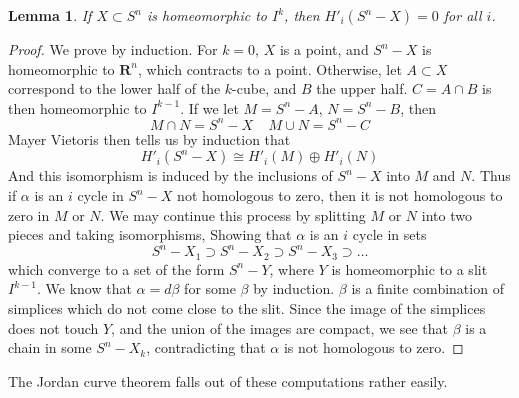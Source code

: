 \documentclass{article}
\theoremstyle{plain}
\newtheorem{lemma}[theorem]{Lemma}
\begin{document}
\begin{lemma}
    If $X \subset S^n$ is homeomorphic to $I^k$, then $H'_i(S^n - X) = 0$ for all $i$.
\end{lemma}
\begin{proof}
    We prove by induction. For $k = 0$, $X$ is a point, and $S^n - X$ is homeomorphic to $\mathbf{R}^n$, which contracts to a point. Otherwise, let $A \subset X$ correspond to the lower half of the $k$-cube, and $B$ the upper half. $C = A \cap B$ is then homeomorphic to $I^{k-1}$. If we let $M = S^n - A$, $N = S^n - B$, then
    \[ M \cap N = S^n - X\ \ \ \ \ M \cup N = S^n - C \]
    Mayer Vietoris then tells us by induction that
    \[ H'_i(S^n - X) \cong H'_i(M) \oplus H'_i(N) \]
    And this isomorphism is induced by the inclusions of $S^n - X$ into $M$ and $N$. Thus if $\alpha$ is an $i$ cycle in $S^n - X$ not homologous to zero, then it is not homologous to zero in $M$ or $N$. We may continue this process by splitting $M$ or $N$ into two pieces and taking isomorphisms, Showing that $\alpha$ is an $i$ cycle in sets
    \[ S^n - X_1 \supset S^n - X_2 \supset S^n - X_3 \supset \dots \]
    which converge to a set of the form $S^n - Y$, where $Y$ is homeomorphic to a slit $I^{k-1}$. We know that $\alpha = d \beta$ for some $\beta$ by induction. $\beta$ is a finite combination of simplices which do not come close to the slit. Since the image of the simplices does not touch $Y$, and the union of the images are compact, we see that $\beta$ is a chain in some $S^n - X_k$, contradicting that $\alpha$ is not homologous to zero.
\end{proof}

The Jordan curve theorem falls out of these computations rather easily.
\end{document}
